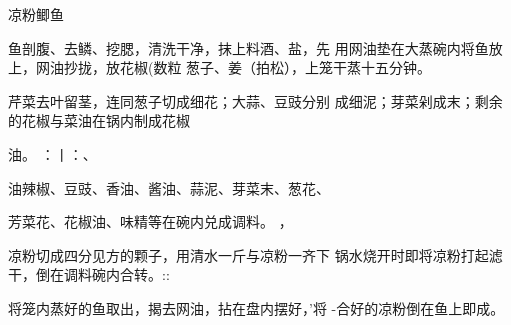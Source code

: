 \begin{recipe}{凉粉鲫鱼}

\ingredients



\cooking

\step 	鱼剖腹、去鳞、挖腮，清洗干净，抹上料酒、盐，先 用网油垫在大蒸碗内将鱼放上，网油抄拢，放花椒(数粒 葱子、姜（拍松），上笼干蒸十五分钟。

\step 	芹菜去叶留茎，连同葱子切成细花；大蒜、豆豉分别 成细泥；芽菜剁成末；剩余的花椒与菜油在锅内制成花椒

油。	：丨：、

\step 	油辣椒、豆豉、香油、酱油、蒜泥、芽菜末、葱花、

芳菜花、花椒油、味精等在碗内兑成调料。	，

\step 	凉粉切成四分见方的颗子，用清水一斤与凉粉一齐下 锅水烧开时即将凉粉打起滤干，倒在调料碗内合转。::

\step 	将笼内蒸好的鱼取出，揭去网油，拈在盘内摆好，’将 -合好的凉粉倒在鱼上即成。

\notes

\notes

\end{recipe}

